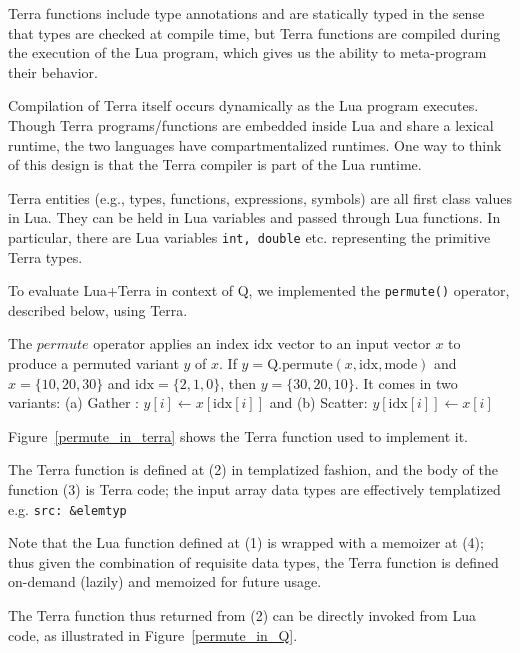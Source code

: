 \item Terra functions include type annotations and are statically typed in the sense that types are checked at compile time, but Terra functions are compiled during the execution of the Lua program, which gives us the ability to meta-program their behavior.

\item Compilation of Terra itself occurs dynamically as the Lua program executes. Though Terra programs/functions are embedded inside Lua and share a lexical runtime, the two languages have compartmentalized runtimes. One way to think of this design is that the Terra compiler
is part of the Lua runtime.

\item Terra entities (e.g., types, functions, expressions, symbols) are all first class values in Lua.
They can be held in Lua variables and passed through Lua functions. In particular, there are Lua variables {\tt int, double} etc. representing the primitive Terra types.

\ee

To evaluate Lua+Terra in context of Q, we implemented the {\tt permute()} operator, described below, using Terra.

The \(permute\) operator applies an index \(\mathrm{idx}\) vector to an input vector \(x\)
to produce a permuted variant \(y\) of \(x\). 
If \(y = \mathrm{Q.permute}(x, \mathrm{idx}, \mathrm{mode})\) and \(x = \{10, 20, 30\}\) and
\(\mathrm{idx} = \{2, 1,
0\}\), then \(y = \{30, 20, 10\}\).
It comes in two variants:
(a) 
Gather : \(y[i] \leftarrow x[\mathrm{idx}[i]]\) and (b) 
Scatter: \(y[\mathrm{idx}[i]] \leftarrow x[i]\) 

\begin{figure}
\centering
{}
\end{figure}

Figure~\ref{permute_in_terra} shows the Terra function used to implement it.
\bi
\item The Terra function is defined at (2) in templatized fashion, and the body of the function (3) is Terra code; the input array data types are effectively templatized e.g. {\tt src: \&elemtyp}
\item Note that the Lua function defined at (1) is wrapped with a memoizer at (4); thus given the combination of requisite data types, the Terra function is defined on-demand (lazily) and memoized for future usage.
\item The Terra function thus returned from (2) can be directly invoked from Lua code, as illustrated in Figure~\ref{permute_in_Q}.
\ei

